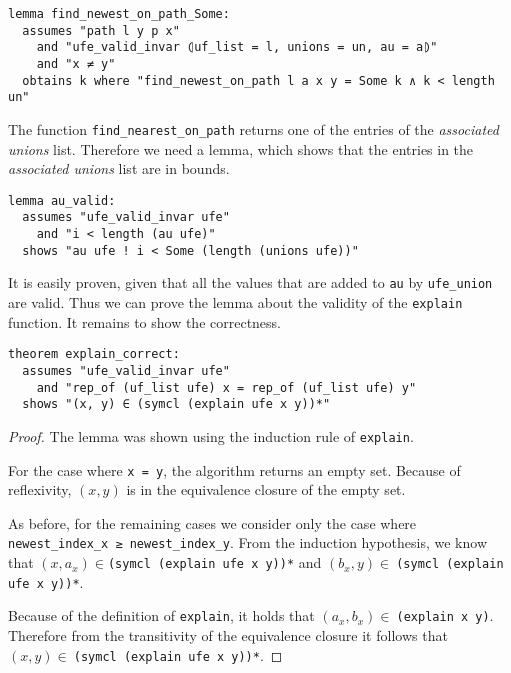 \begin{lstlisting}
lemma find_newest_on_path_Some:
  assumes "path l y p x"
    and "ufe_valid_invar ⦇uf_list = l, unions = un, au = a⦈"
    and "x ≠ y"
  obtains k where "find_newest_on_path l a x y = Some k ∧ k < length un"
\end{lstlisting}

The function \lstinline{find_nearest_on_path} returns one of the entries of the \emph{associated unions} list.
Therefore we need a lemma, which shows that the entries in the \emph{associated unions} list are in bounds.

\begin{lstlisting}
lemma au_valid:
  assumes "ufe_valid_invar ufe"
    and "i < length (au ufe)"
  shows "au ufe ! i < Some (length (unions ufe))"
\end{lstlisting}

It is easily proven, given that all the values that are added to \lstinline|au| by \lstinline|ufe_union| are valid.
Thus we can prove the lemma about the validity of the \lstinline|explain| function.
It remains to show the correctness.

\begin{lstlisting}
theorem explain_correct:
  assumes "ufe_valid_invar ufe"
    and "rep_of (uf_list ufe) x = rep_of (uf_list ufe) y"
  shows "(x, y) ∈ (symcl (explain ufe x y))*"
\end{lstlisting}

\begin{proof}
The lemma was shown using the induction rule of \lstinline|explain|.

For the case where \lstinline|x = y|, the algorithm returns an empty set. Because of reflexivity, $(x, y)$ is in the equivalence closure of the empty set.

As before, for the remaining cases we consider only the case where \lstinline|newest_index_x ≥ newest_index_y|.
From the induction hypothesis, we know that $(x, a_x) \in$\lstinline{(symcl (explain ufe x y))*} and $(b_x, y) \in\:$\lstinline{(symcl (explain ufe x y))*}.

Because of the definition of \lstinline|explain|, it holds that $(a_x, b_x) \in\:$\lstinline{(explain x y)}. Therefore from the transitivity of the equivalence closure it follows that $(x, y) \in\:$\lstinline{(symcl (explain ufe x y))*}.
\end{proof}
